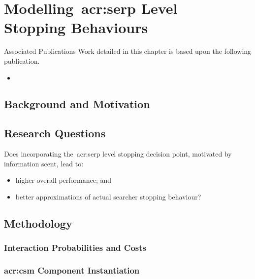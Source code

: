 
\chapter[Modelling~\gls{acr:serp} Level Stopping Behaviours]{Modelling~\gls{acr:serp} Level\\Stopping Behaviours}\label{chap:serp}

\begin{publications_box}{Associated Publications}
Work detailed in this chapter is based upon the following publication.
\vspace*{-2mm}
\begin{itemize}
    \item{}
\end{itemize}
\end{publications_box}

\section{Background and Motivation}

\section{Research Questions}

Does incorporating the~\gls{acr:serp} level stopping decision point, motivated by information scent, lead to:

\begin{itemize}
    
    \item[]{ higher overall performance; and}
    \item[]{ better approximations of actual searcher stopping behaviour?}
    
\end{itemize}

\section{Methodology}

\subsection{Interaction Probabilities and Costs}

\subsection{\gls{acr:csm} Component Instantiation}

